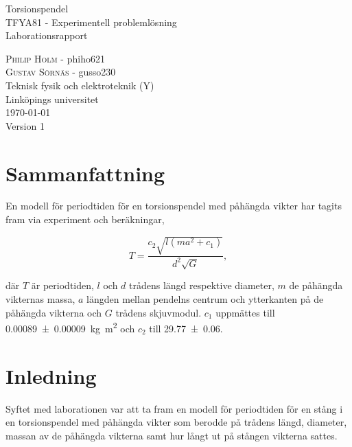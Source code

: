 \documentclass[a4paper,12pt]{article}
\begin{document}
\begin{titlepage}
  \centering
  \vspace{10cm}
  {\Huge Torsionspendel \\}
  \vspace{2cm}
  {\Large TFYA81 - Experimentell problemlösning \\}
  \vspace{0.8em}
  {\Large Laborationsrapport}
  \vfill

  {
    \textsc{Philip Holm} - phiho621 \\
    \textsc{Gustav Sörnäs} - gusso230 \\
    \vspace{2cm}
    Teknisk fysik och elektroteknik (Y) \\
    Linköpings universitet\\\today{}\\Version 1
  }

\end{titlepage}

\section*{Sammanfattning}

En modell för periodtiden för en torsionspendel med påhängda vikter har tagits
fram via experiment och beräkningar,

\begin{equation*}
  T = \frac{c_2 \sqrt{l(ma^2 + c_1)}}{d^2 \sqrt{G}},
\end{equation*}

där $T$ är periodtiden, $l$ och $d$ trådens längd respektive diameter, $m$ de
påhängda vikternas massa, $a$ längden mellan pendelns centrum och ytterkanten på
de påhängda vikterna och $G$ trådens skjuvmodul. $c_1$ uppmättes till
\SI{0.00089(9)}{\kilogram \meter \squared} och $c_2$ till
\num{29.77(6)}. %

\clearpage

\tableofcontents
\clearpage


\section{Inledning}

Syftet med laborationen var att ta fram en modell för periodtiden för en stång i
en torsionspendel med påhängda vikter som berodde på trådens längd, diameter,
massan av de påhängda vikterna samt hur långt ut på stången vikterna sattes.
\end{document}
